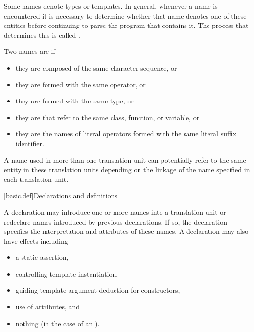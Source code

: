 \pnum
Some names denote types or templates. In general,
whenever a name is encountered it is necessary to determine whether that name denotes
one of these entities before continuing to parse the program that contains it. The
process that determines this is called
.

\pnum
Two names are  if
\begin{itemize}
\item they are  composed of the same character sequence, or
\item they are  formed with
the same operator, or
\item they are  formed
with the same type, or
\item they are  that refer to the same class,
function, or variable, or
\item they are the names of literal operators formed with
the same literal suffix identifier.
\end{itemize}

\pnum
{}%
%
A name used in more than one translation unit can potentially
refer to the same entity in these translation units depending on the
linkage of the name specified in each
translation unit.

[basic.def]{Declarations and definitions}

\pnum
{}%
%
%
A declaration may introduce
one or more names into a translation
unit or redeclare names introduced by previous declarations.
If so, the
declaration specifies the interpretation and attributes of these names.
A declaration may also have effects including:
\begin{itemize}
\item a static assertion,
\item controlling template instantiation,
\item guiding template argument deduction for constructors,
\item use of attributes, and
\item nothing (in the case of an ).
\end{itemize}

